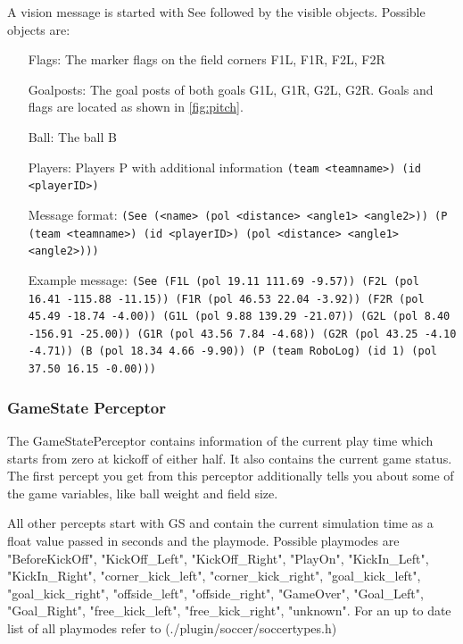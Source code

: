 A vision message is started with See followed by the visible objects.
Possible objects are:
\begin{itemize}
	\item[Flags:] The marker flags on the field corners F1L, F1R, F2L, F2R
	\item[Goalposts:] The goal posts of both goals G1L, G1R, G2L, G2R. Goals and
	flags are located as shown in \ref{fig:pitch}.
	\item[Ball:] The ball B 
	\item[Players:] Players P with additional information \texttt{(team <teamname>)
	(id <playerID>)}
\end{itemize}
\begin{itemize}
	\item[Message format:] \texttt{(See (<name> (pol <distance> <angle1>
	<angle2>)) (P (team <teamname>) (id <playerID>) (pol <distance> <angle1> <angle2>)))}
	\item[Example message:] \texttt{(See (F1L (pol 19.11 111.69 -9.57)) (F2L (pol 
	16.41 -115.88 -11.15)) (F1R (pol 46.53 22.04 -3.92)) (F2R (pol 45.49 -18.74
	-4.00)) (G1L (pol 9.88 139.29 -21.07)) (G2L (pol 8.40 -156.91 -25.00)) (G1R
	(pol 43.56 7.84 -4.68)) (G2R (pol 43.25 -4.10 -4.71)) (B (pol 18.34 4.66
	-9.90)) (P (team RoboLog) (id 1) (pol 37.50 16.15 -0.00)))}
\end{itemize}

\subsubsection{GameState Perceptor}
The GameStatePerceptor contains information of the current play time which
starts from zero at kickoff of either half. It also contains the current game status.
The first percept you get from this perceptor additionally tells you about some
of the game variables, like ball weight and field size.

All other percepts start with GS and contain the current simulation time as a
float value passed in seconds and the playmode. Possible
playmodes are "BeforeKickOff", "KickOff\_Left", "KickOff\_Right",
"PlayOn", "KickIn\_Left", "KickIn\_Right", "corner\_kick\_left",
"corner\_kick\_right", "goal\_kick\_left", "goal\_kick\_right",
"offside\_left", "offside\_right", "GameOver", "Goal\_Left",
"Goal\_Right", "free\_kick\_left", "free\_kick\_right", "unknown". For an
up to date list of all playmodes refer to (./plugin/soccer/soccertypes.h)

